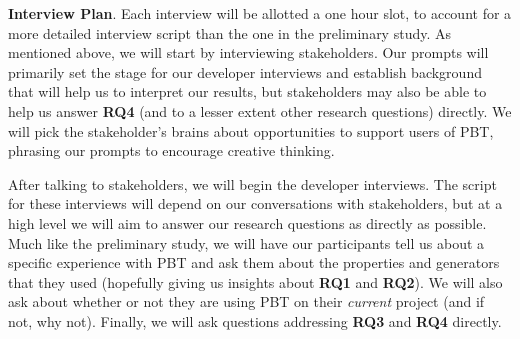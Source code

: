 

\textbf{Interview Plan}.
Each interview will be allotted a one hour slot, to account for a more detailed
interview script than the one in the preliminary study. As mentioned above, we
will start by interviewing stakeholders. Our prompts will primarily set the
stage for our developer interviews and establish background that will help us to
interpret our results, but stakeholders may also be able to help us answer {\bf
RQ4} (and to a lesser extent other research questions) directly. We will pick
the stakeholder's brains about opportunities to support users
of PBT, phrasing our prompts to encourage creative thinking.

After talking to stakeholders, we will begin the developer interviews. The
script for these interviews will depend on our conversations with stakeholders,
but at a high level we will aim to answer our research questions as directly as
possible. Much like the preliminary study, we will have our participants tell us about a
specific experience with PBT and ask them about the properties and generators
that they used (hopefully giving us insights about {\bf RQ1} and {\bf RQ2}).  We
will also ask about whether or not they are using PBT on their {\em current}
project (and if not, why not). Finally, we will ask questions addressing
{\bf RQ3} and {\bf RQ4} directly.

